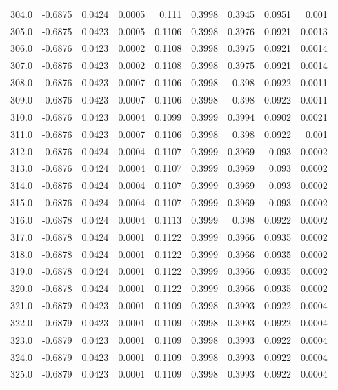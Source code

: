 \begin{longtable}{lrrrrrrrr}
304.0 & -0.6875 & 0.0424 & 0.0005 & 0.111 & 0.3998 & 0.3945 & 0.0951 & 0.001 \\
305.0 & -0.6875 & 0.0423 & 0.0005 & 0.1106 & 0.3998 & 0.3976 & 0.0921 & 0.0013 \\
306.0 & -0.6876 & 0.0423 & 0.0002 & 0.1108 & 0.3998 & 0.3975 & 0.0921 & 0.0014 \\
307.0 & -0.6876 & 0.0423 & 0.0002 & 0.1108 & 0.3998 & 0.3975 & 0.0921 & 0.0014 \\
308.0 & -0.6876 & 0.0423 & 0.0007 & 0.1106 & 0.3998 & 0.398 & 0.0922 & 0.0011 \\
309.0 & -0.6876 & 0.0423 & 0.0007 & 0.1106 & 0.3998 & 0.398 & 0.0922 & 0.0011 \\
310.0 & -0.6876 & 0.0423 & 0.0004 & 0.1099 & 0.3999 & 0.3994 & 0.0902 & 0.0021 \\
311.0 & -0.6876 & 0.0423 & 0.0007 & 0.1106 & 0.3998 & 0.398 & 0.0922 & 0.001 \\
312.0 & -0.6876 & 0.0424 & 0.0004 & 0.1107 & 0.3999 & 0.3969 & 0.093 & 0.0002 \\
313.0 & -0.6876 & 0.0424 & 0.0004 & 0.1107 & 0.3999 & 0.3969 & 0.093 & 0.0002 \\
314.0 & -0.6876 & 0.0424 & 0.0004 & 0.1107 & 0.3999 & 0.3969 & 0.093 & 0.0002 \\
315.0 & -0.6876 & 0.0424 & 0.0004 & 0.1107 & 0.3999 & 0.3969 & 0.093 & 0.0002 \\
316.0 & -0.6878 & 0.0424 & 0.0004 & 0.1113 & 0.3999 & 0.398 & 0.0922 & 0.0002 \\
317.0 & -0.6878 & 0.0424 & 0.0001 & 0.1122 & 0.3999 & 0.3966 & 0.0935 & 0.0002 \\
318.0 & -0.6878 & 0.0424 & 0.0001 & 0.1122 & 0.3999 & 0.3966 & 0.0935 & 0.0002 \\
319.0 & -0.6878 & 0.0424 & 0.0001 & 0.1122 & 0.3999 & 0.3966 & 0.0935 & 0.0002 \\
320.0 & -0.6878 & 0.0424 & 0.0001 & 0.1122 & 0.3999 & 0.3966 & 0.0935 & 0.0002 \\
321.0 & -0.6879 & 0.0423 & 0.0001 & 0.1109 & 0.3998 & 0.3993 & 0.0922 & 0.0004 \\
322.0 & -0.6879 & 0.0423 & 0.0001 & 0.1109 & 0.3998 & 0.3993 & 0.0922 & 0.0004 \\
323.0 & -0.6879 & 0.0423 & 0.0001 & 0.1109 & 0.3998 & 0.3993 & 0.0922 & 0.0004 \\
324.0 & -0.6879 & 0.0423 & 0.0001 & 0.1109 & 0.3998 & 0.3993 & 0.0922 & 0.0004 \\
325.0 & -0.6879 & 0.0423 & 0.0001 & 0.1109 & 0.3998 & 0.3993 & 0.0922 & 0.0004 \\

\end{longtable}

